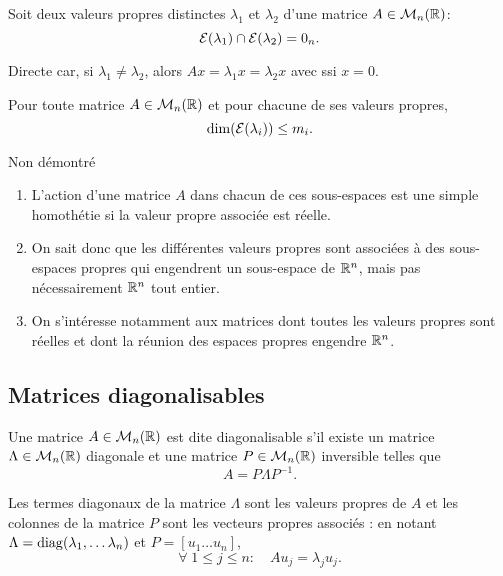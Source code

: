 \begin{proposition}
  Soit deux valeurs propres distinctes $\lambda_1$ et $\lambda_2$ d'une matrice $A \in \mathcal{M}_n(\mathbb{R})$:
  $$
  \mathcal{E}(\lambda_1) \cap \mathcal{E}(\lambda_2) = 0_n.
  $$
\end{proposition}

\proof
Directe car, si $\lambda_1 \neq \lambda_2$, alors $Ax = \lambda_1 x = \lambda_2 x$ avec  ssi $x = 0$.
\eproof


\begin{proposition}
  Pour toute matrice $A \in \mathcal{M}_n(\mathbb{R})$ et pour chacune de ses valeurs propres, 
  $$
  \dim(\mathcal{E}(\lambda_i)) \leq m_i.
  $$
\end{proposition}

\proof
Non démontré
\eproof


\remarks
\begin{enumerate}
  \item L'action d'une matrice $A$ dans chacun de ces sous-espaces est une simple homothétie si la valeur propre associée est réelle.
  \item On sait donc que les différentes valeurs propres sont associées à des sous-espaces propres qui engendrent un sous-espace de $\mathbb{R}^n$, mais pas nécessairement $\mathbb{R}^n$ tout entier. 
  \item On s'intéresse notamment aux matrices dont toutes les valeurs propres sont réelles et dont la réunion des espaces propres engendre $\mathbb{R}^n$.
\end{enumerate}

\subsection{Matrices diagonalisables} \label{sec:MatDiag}

\begin{definition} \label{def:matriceDiagonalisable}
  Une matrice $A \in \mathcal{M}_n(\mathbb{R})$ est dite diagonalisable s'il existe un matrice $\Lambda \in \mathcal{M}_n(\mathbb{R})$ diagonale et une matrice $P \in \mathcal{M}_n(\mathbb{R})$ inversible telles que
  $$
  A = P \Lambda P^{-1}.
  $$
\end{definition}

\begin{proposition}
  Les termes diagonaux de la matrice $\Lambda$ sont les valeurs propres de $A$ et les colonnes de la matrice $P$ sont les vecteurs propres associés :
  en notant $\Lambda = \operatorname{diag}(\lambda_1, \dots \lambda_n)$ et $P = [u_1 \dots u_n]$, 
  $$
  \forall \; 1 \leq j \leq n: \quad A u_j = \lambda_j u_j.
  $$
\end{proposition}

